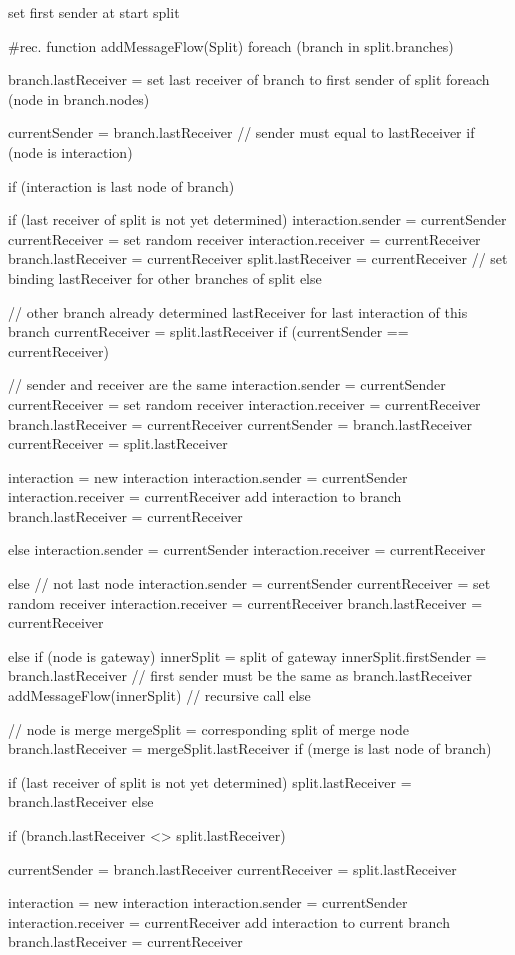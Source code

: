 \documentclass[a4paper, 11pt, oneside, BCOR1cm,toc=chapterentrywithdots]{scrbook}
\begin{document}
set first sender at start split

#rec. function
addMessageFlow(Split)
foreach (branch in split.branches) {
	branch.lastReceiver = set last receiver of branch to first sender of split
	foreach (node in branch.nodes) {
		currentSender = branch.lastReceiver // sender must equal to lastReceiver
		if (node is interaction) {
			if (interaction is last node of branch) {
				if (last receiver of split is not yet determined) {
					interaction.sender = currentSender
					currentReceiver = set random receiver
					interaction.receiver = currentReceiver
					branch.lastReceiver = currentReceiver
					split.lastReceiver = currentReceiver // set binding lastReceiver for other branches of split
				} else { // other branch already determined lastReceiver for last interaction of this branch
					currentReceiver = split.lastReceiver
					if (currentSender == currentReceiver) { // sender and receiver are the same
						interaction.sender = currentSender
						currentReceiver = set random receiver
						interaction.receiver = currentReceiver
						branch.lastReceiver = currentReceiver
						currentSender = branch.lastReceiver
						currentReceiver = split.lastReceiver
						
						interaction = new interaction
						interaction.sender = currentSender
						interaction.receiver = currentReceiver
						add interaction to branch
						branch.lastReceiver = currentReceiver
					} else {
						interaction.sender = currentSender
						interaction.receiver = currentReceiver
					}
				}
			} else { // not last node
				interaction.sender = currentSender
				currentReceiver = set random receiver
				interaction.receiver = currentReceiver
				branch.lastReceiver = currentReceiver
			}
		} else if (node is gateway) {
			innerSplit = split of gateway
			innerSplit.firstSender = branch.lastReceiver // first sender must be the same as branch.lastReceiver
			addMessageFlow(innerSplit) // recursive call
 		} else { // node is merge
			mergeSplit = corresponding split of merge node
			branch.lastReceiver = mergeSplit.lastReceiver	
			if (merge is last node of branch) {
				if (last receiver of split is not yet determined) {
					split.lastReceiver = branch.lastReceiver
				} else {
					if (branch.lastReceiver <> split.lastReceiver) {
						currentSender = branch.lastReceiver
						currentReceiver = split.lastReceiver
						
						interaction = new interaction
						interaction.sender = currentSender
						interaction.receiver = currentReceiver
						add interaction to current branch
						branch.lastReceiver = currentReceiver
					}
				}
			}
		}
	}
}
\end{document}
